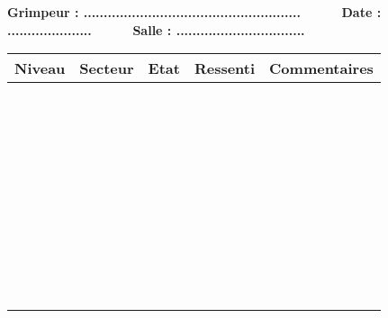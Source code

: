 \documentclass[a4paper]{article}
\begin{document}
\pagestyle{empty}

\textbf{Grimpeur : ...................................................... \ \ \ \ \ Date : ..................... \ \ \ \ \ Salle : ................................}\\

\begin{tabular}{|p{1cm}|p{2.5cm}|p{1cm}|p{4cm}|p{5cm}|}
\hline
Niveau & Secteur & Etat \footnotemark & Ressenti & Commentaires \\
\hline
&&&&\\
&&&&\\
\hline
&&&&\\
&&&&\\
\hline
&&&&\\
&&&&\\
\hline
&&&&\\
&&&&\\
\hline
&&&&\\
&&&&\\
\hline
&&&&\\
&&&&\\
\hline
&&&&\\
&&&&\\
\hline
&&&&\\
&&&&\\
\hline
&&&&\\
&&&&\\
\hline
&&&&\\
&&&&\\
\hline
&&&&\\
&&&&\\
\hline
&&&&\\
&&&&\\
\hline
&&&&\\
&&&&\\
\hline
&&&&\\
&&&&\\
\hline
&&&&\\
&&&&\\
\hline
&&&&\\
&&&&\\
\hline
&&&&\\
&&&&\\
\hline
&&&&\\
&&&&\\
\hline
&&&&\\
&&&&\\
\hline
&&&&\\
&&&&\\
\hline
&&&&\\
&&&&\\

\end{tabular}
\end{document}
